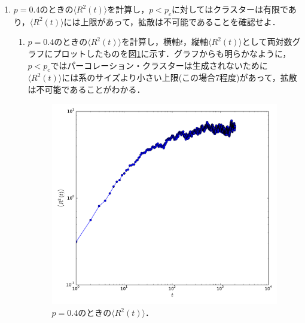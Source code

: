 \documentclass{jsarticle}
\begin{document}
\begin{enumerate}
\begin{enumerate}
            \end{enumerate}    
        
        \item $p=0.4$のときの$\langle R^{2}(t) \rangle$を計算し，$p<p_{c}$に対してはクラスターは有限であり，$\langle R^{2}(t) \rangle$には上限があって，拡散は不可能であることを確認せよ．
            \begin{enumerate}
                \item $p=0.4$のときの$\langle R^{2}(t) \rangle$を計算し，横軸$t$，縦軸$\langle R^{2}(t) \rangle$として両対数グラフにプロットしたものを図\ref{fig:14-8-f2}に示す．グラフからも明らかなように，$p<p_{c}$ではパーコレーション・クラスターは生成されないために$\langle R^{2}(t) \rangle$には系のサイズより小さい上限(この場合7程度)があって，拡散は不可能であることがわかる．
                
                \begin{figure}[H]
                    \begin{center}
                        \includegraphics[width=10.0cm]{figure_2.pdf}
                        \caption{$p=0.4$のときの$\langle R^{2}(t) \rangle$．}
                        \label{fig:14-8-f2}
                    \end{center}
                \end{figure}

                
            \end{enumerate} 
        

\end{enumerate}
\end{document}
